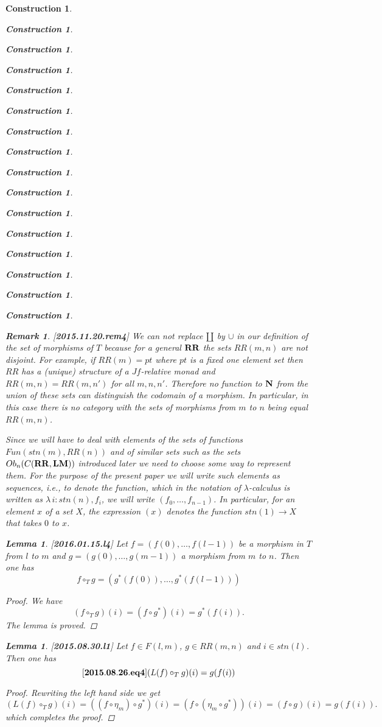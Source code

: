 \documentclass[12pt]{amsart}
\newenvironment{eq}{\begin{equation}}{\end{equation}}
\newtheorem{lemma}[proposition]{Lemma}
\newtheorem{remark}[proposition]{Remark}
\newtheorem{construction}[proposition]{Construction}
\newcommand{\llabel}[1]{\label{#1}[{\bf #1}]}
\renewcommand{\comment}[1]{}
\newcommand{\sr}{\rightarrow}
\newcommand{\nn}{{\bf N\rm}}
\newcommand{\nat}{\nn}
\newcommand{\mbind}[1]{{#1^*}}
\newcommand{\hc}{\circ_{T}}
\newcommand{\RR}{{\bf RR}}
\newcommand{\LM}{{\bf LM}}
\begin{document}
\begin{construction}
\begin{construction}
\begin{construction}
\begin{construction}
\begin{construction}
\begin{construction}
\begin{construction}
\begin{construction}
\begin{construction}
\begin{construction}
\begin{construction}
\begin{construction}
\begin{construction}
\begin{construction}
\begin{construction}
\begin{construction}
\comment{Similarly, we will use the functions $\mbind{m}$ as a coercions so that when an element $g$ of $RR(m,n)$ occurs in a position where a function from $RR(m)$ to $RR(n)$ is expected it has to be replaced by $\mbind{g}$. }
%
\begin{remark}\rm
\llabel{2015.11.20.rem4}
We can not replace $\amalg$ by $\cup$ in our definition of the set of morphisms of $T$ because for a general $\RR$ the sets $RR(m,n)$ are not disjoint.  For example, if $RR(m)=pt$ where $pt$ is a fixed one element set then $RR$ has a (unique) structure of a $Jf$-relative monad and $RR(m,n)=RR(m,n')$ for all $m,n,n'$. Therefore no function to $\nat$ from the union of these sets can distinguish the codomain of a morphism. In particular, in this case there is no category with the sets of morphisms from $m$ to $n$ being equal $RR(m,n)$. 
\end{remark}
%
Since we will have to deal with elements of the sets of functions $Fun(stn(m),RR(n))$ and of similar sets such as the sets $Ob_n(C(\RR,\LM))$ introduced later we need to choose some way to represent them. For the purpose of the present paper we will write such elements as sequences, i.e., to denote the function, which in the notation of $\lambda$-calculus is written as $\lambda\,i:stn(n), f_i$, we will write $(f_0,\dots,f_{n-1})$. In particular, for an element $x$ of a set $X$, the expression $(x)$ denotes the function $stn(1)\sr X$ that takes $0$ to $x$. 
%
\begin{lemma}
\llabel{2016.01.15.l4}
Let $f=(f(0),\dots,f(l-1))$ be a morphism in $T$ from $l$ to $m$ and $g=(g(0),\dots,g(m-1))$ a morphism from $m$ to $n$. Then one has
%
$$f\hc g=(\mbind{g}(f(0)),\dots,\mbind{g}(f(l-1)))$$
%
\end{lemma}
%
\begin{proof}
We have
%
$$(f\hc g)(i)=(f\circ\mbind{g})(i)=\mbind{g}(f(i)).$$
%
The lemma is proved. 
\end{proof}
%
\begin{lemma}
\llabel{2015.08.30.l1}
Let $f\in F(l,m)$, $g\in RR(m,n)$ and $i\in stn(l)$. Then one has
%
\begin{eq}\llabel{2015.08.26.eq4}
(L(f)\hc g)(i)=g(f(i))
\end{eq}
% 
\end{lemma}
%
\begin{proof}
Rewriting the left hand side we get 
%
$$(L(f)\hc g)(i)=((f\circ \eta_{m})\circ \mbind{g})(i)=(f\circ (\eta_{m}\circ \mbind{g}))(i)=(f\circ g)(i)=g(f(i)).$$
%
which completes the proof. 
\end{proof}

\end{construction}
\end{construction}
\end{construction}
\end{construction}
\end{construction}
\end{construction}
\end{construction}
\end{construction}
\end{construction}
\end{construction}
\end{construction}
\end{construction}
\end{construction}
\end{construction}
\end{construction}
\end{construction}
\end{document}
